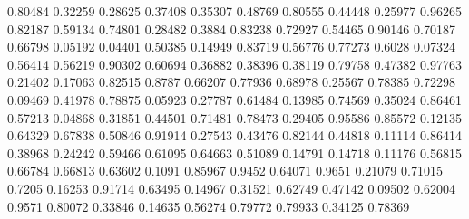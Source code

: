 \documentclass{article}
\newenvironment{eulernotebook}{\par}{\par}
\newenvironment{eulercomment}{\par\medskip}{\par\medskip}
\begin{document}
\begin{eulernotebook}
\begin{eulercomment}
\begin{eulercomment}
\begin{eulercomment}
\begin{eulercomment}
\begin{eulercomment}
\begin{eulercomment}
\begin{euleroutput}
              0.80484
              0.32259
              0.28625
              0.37408
              0.35307
              0.48769
              0.80555
              0.44448
              0.25977
              0.96265
              0.82187
              0.59134
              0.74801
              0.28482
               0.3884
              0.83238
              0.72927
              0.54465
              0.90146
              0.70187
              0.66798
              0.05192
              0.04401
              0.50385
              0.14949
              0.83719
              0.56776
              0.77273
               0.6028
              0.07324
              0.56414
              0.56219
              0.90302
              0.60694
              0.36882
              0.38396
              0.38119
              0.79758
              0.47382
              0.97763
              0.21402
              0.17063
              0.82515
               0.8787
              0.66207
              0.77936
              0.68978
              0.25567
              0.78385
              0.72298
              0.09469
              0.41978
              0.78875
              0.05923
              0.27787
              0.61484
              0.13985
              0.74569
              0.35024
              0.86461
              0.57213
              0.04868
              0.31851
              0.44501
              0.71481
              0.78473
              0.29405
              0.95586
              0.85572
              0.12135
              0.64329
              0.67838
              0.50846
              0.91914
              0.27543
              0.43476
              0.82144
              0.44818
              0.11114
              0.86414
              0.38968
              0.24242
              0.59466
              0.61095
              0.64663
              0.51089
              0.14791
              0.14718
              0.11176
              0.56815
              0.66784
              0.66813
              0.63602
               0.1091
              0.85967
               0.9452
              0.64071
               0.9651
              0.21079
              0.71015
               0.7205
              0.16253
              0.91714
              0.63495
              0.14967
              0.31521
              0.62749
              0.47142
              0.09502
              0.62004
               0.9571
              0.80072
              0.33846
              0.14635
              0.56274
              0.79772
              0.79933
              0.34125
              0.78369

\end{euleroutput}
\end{eulercomment}
\end{eulercomment}
\end{eulercomment}
\end{eulercomment}
\end{eulercomment}
\end{eulercomment}
\end{eulernotebook}
\end{document}
